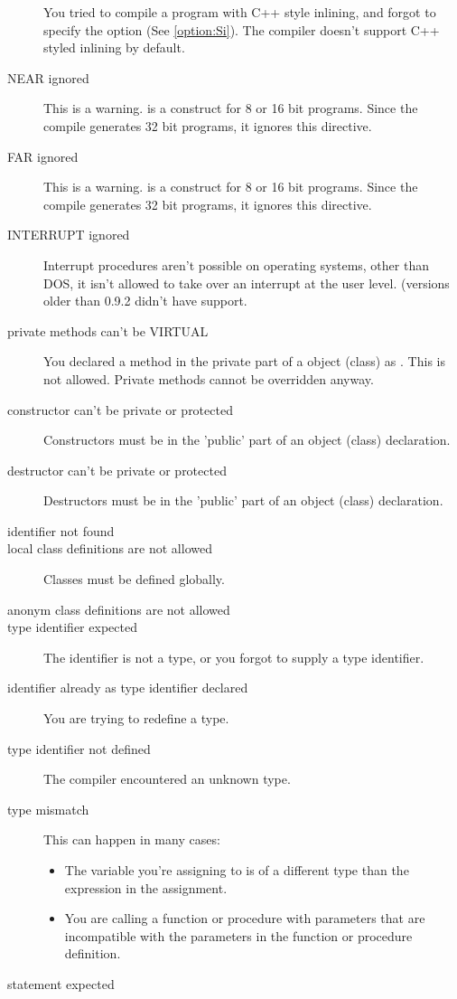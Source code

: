 \documentclass{report}
\newcommand{\seeo}[1]{See \ref{option:#1}}
\begin{document}
\begin{description}
You tried to compile a program with C++ style inlining, and forgot to
specify the  option (\seeo{Si}). The compiler doesn't support C++
styled inlining by default. 
\item [NEAR ignored]
This is a warning.  is a construct for 8 or 16 bit programs. Since
the compile generates 32 bit programs, it ignores this directive.
\item [FAR ignored]
This is a warning.  is a construct for 8 or 16 bit programs. Since
the compile generates 32 bit programs, it ignores this directive.
\item [INTERRUPT ignored]
Interrupt procedures aren't possible on operating systems, other than DOS, 
it isn't allowed to take over an interrupt at the user level. (versions
older than 0.9.2 didn't have  support.
\item [private methods can't be VIRTUAL]
You declared a method in the private part of a object (class) as
. This is not allowed. Private methods cannot be overridden
anyway.
\item [constructor can't be private or protected]
Constructors must be in the 'public' part of an object (class) declaration. 
\item [destructor can't be private or protected]
Destructors must be in the 'public' part of an object (class) declaration. 
\item [identifier not found]
\item [local class definitions are not allowed]
Classes must be defined globally.
\item [anonym class definitions are not allowed]
\item [type identifier expected]
The identifier is not a type, or you forgot to supply a type identifier.
\item [identifier already as type identifier declared]
You are trying to redefine a type.
\item [type identifier not defined]
The compiler encountered an unknown type.
\item [type mismatch]
This can happen in many cases:
\begin{itemize}
\item The variable you're assigning to is of a different type than the
expression in the assignment.
\item You are calling a function or procedure with parameters that are 
incompatible with the parameters in the function or procedure definition.
\end{itemize}
\item [statement expected]


\end{description}
\end{document}
